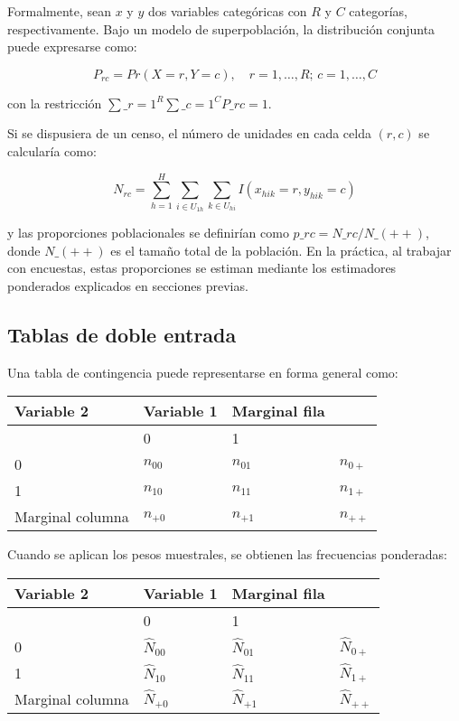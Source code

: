 \documentclass[
  12pt,
]{book}
\begin{document}
Formalmente, sean \(x\) y \(y\) dos variables categóricas con \(R\) y \(C\) categorías, respectivamente. Bajo un modelo de superpoblación, la distribución conjunta puede expresarse como:

\[
P_{rc} = Pr(X=r, Y=c), \quad r=1,\dots,R;\, c=1,\dots,C
\tag{9-24}
\]

con la restricción \(\sum\_{r=1}^{R}\sum\_{c=1}^{C} P\_{rc}=1\).

Si se dispusiera de un censo, el número de unidades en cada celda \((r,c)\) se calcularía como:

\[
N_{rc} = \sum_{h=1}^{H} \sum_{i \in U_{1h}} \sum_{k \in U_{hi}} I(x_{hik}=r, y_{hik}=c) 
\tag{9-25}
\]

y las proporciones poblacionales se definirían como \(p\_{rc} = N\_{rc}/N\_{(++)}\), donde \(N\_{(++)}\) es el tamaño total de la población. En la práctica, al trabajar con encuestas, estas proporciones se estiman mediante los estimadores ponderados explicados en secciones previas.

\subsection{Tablas de doble entrada}\label{tablas-de-doble-entrada}

Una tabla de contingencia puede representarse en forma general como:

\begin{longtable}[]{@{}llll@{}}
\toprule\noalign{}
Variable 2 & Variable 1 & Marginal fila & \\
\midrule\noalign{}
\endhead
\bottomrule\noalign{}
\endlastfoot
& 0 & 1 & \\
0 & \(n_{00}\) & \(n_{01}\) & \(n_{0+}\) \\
1 & \(n_{10}\) & \(n_{11}\) & \(n_{1+}\) \\
Marginal columna & \(n_{+0}\) & \(n_{+1}\) & \(n_{++}\) \\
\end{longtable}

Cuando se aplican los pesos muestrales, se obtienen las frecuencias ponderadas:

\begin{longtable}[]{@{}llll@{}}
\toprule\noalign{}
Variable 2 & Variable 1 & Marginal fila & \\
\midrule\noalign{}
\endhead
\bottomrule\noalign{}
\endlastfoot
& 0 & 1 & \\
0 & \(\hat{N}_{00}\) & \(\hat{N}_{01}\) & \(\hat{N}_{0+}\) \\
1 & \(\hat{N}_{10}\) & \(\hat{N}_{11}\) & \(\hat{N}_{1+}\) \\
Marginal columna & \(\hat{N}_{+0}\) & \(\hat{N}_{+1}\) & \(\hat{N}_{++}\) \\
\end{longtable}
\end{document}
